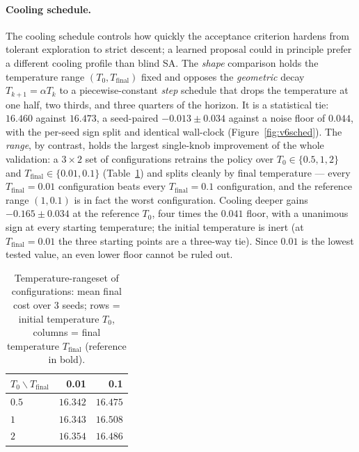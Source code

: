 \documentclass[letterpaper]{article} %
\begin{document}
\paragraph{Cooling schedule.}
The cooling schedule controls how quickly the acceptance criterion hardens from tolerant exploration to strict descent; a learned proposal could in principle prefer a different cooling profile than blind SA. The \emph{shape} comparison holds the temperature range $(T_0, T_{\mathrm{final}})$ fixed and opposes the \textit{geometric} decay $T_{k+1} = \alpha T_k$ to a piecewise-constant \textit{step} schedule that drops the temperature at one half, two thirds, and three quarters of the horizon. It is a statistical tie: $16.460$ against $16.473$, a seed-paired $-0.013 \pm 0.034$ against a noise floor of $0.044$, with the per-seed sign split and identical wall-clock (Figure~\ref{fig:v6sched}). The \emph{range}, by contrast, holds the largest single-knob improvement of the whole validation: a $3 \times 2$ set of configurations retrains the policy over $T_0 \in \{0.5, 1, 2\}$ and $T_{\mathrm{final}} \in \{0.01, 0.1\}$ (Table~\ref{tab:temprange}) and splits cleanly by final temperature --- every $T_{\mathrm{final}} = 0.01$ configuration beats every $T_{\mathrm{final}} = 0.1$ configuration, and the reference range $(1, 0.1)$ is in fact the worst configuration. Cooling deeper gains $-0.165 \pm 0.034$ at the reference $T_0$, four times the $0.041$ floor, with a unanimous sign at every starting temperature; the initial temperature is inert (at $T_{\mathrm{final}} = 0.01$ the three starting points are a three-way tie). Since $0.01$ is the lowest tested value, an even lower floor cannot be ruled out.

\begin{table}[t]
\centering
\small
\begin{tabular}{lrr}
\toprule
\textbf{$T_0 \backslash T_{\mathrm{final}}$} & \textbf{0.01} & \textbf{0.1} \\
\midrule
$0.5$ & $16.342$ & $16.475$ \\
$1$   & $16.343$ & $\mathbf{16.508}$ \\
$2$   & $16.354$ & $16.486$ \\
\bottomrule
\end{tabular}
\caption{Temperature-rangeset of configurations: mean final cost over $3$ seeds; rows = initial temperature $T_0$, columns = final temperature $T_{\mathrm{final}}$ (reference in bold).}
\label{tab:temprange}
\end{table}
\end{document}
